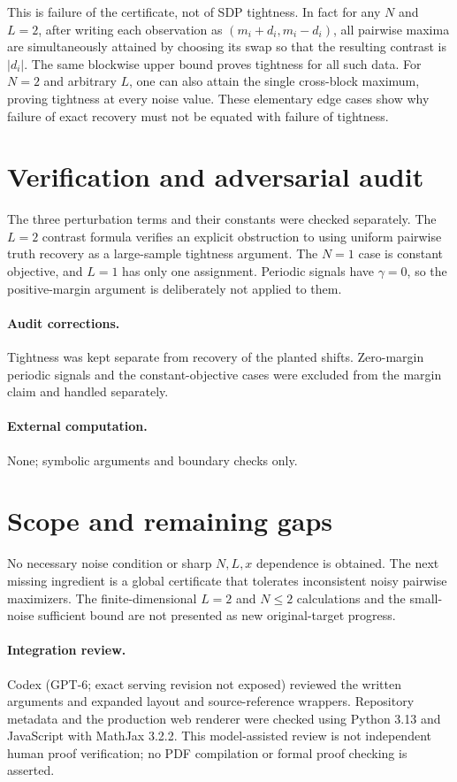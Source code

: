 \documentclass[11pt]{article}
\begin{document}
This is failure of the certificate, not of SDP tightness. In fact for any $N$
and $L=2$, after writing each observation as $(m_i+d_i,m_i-d_i)$, all pairwise
maxima are simultaneously attained by choosing its swap so that the resulting
contrast is $|d_i|$. The same blockwise upper bound proves tightness for all such
data. For $N=2$ and arbitrary $L$, one can also attain the single cross-block
maximum, proving tightness at every noise value. These elementary edge cases
show why failure of exact recovery must not be equated with failure of tightness.
\section{Verification and adversarial audit}
The three perturbation terms and their constants were checked separately.
The $L=2$ contrast formula verifies an explicit obstruction to using uniform
pairwise truth recovery as a large-sample tightness argument. The $N=1$ case is
constant objective, and $L=1$ has only one assignment. Periodic signals have
$\gamma=0$, so the positive-margin argument is deliberately not applied to them.
\paragraph{Audit corrections.} Tightness was kept separate from recovery of the planted shifts. Zero-margin periodic signals and the constant-objective cases were excluded from the margin claim and handled separately.
\paragraph{External computation.} None; symbolic arguments and boundary checks only.
\section{Scope and remaining gaps}
No necessary noise condition or sharp $N,L,x$ dependence is obtained. The
next missing ingredient is a global certificate that tolerates inconsistent noisy
pairwise maximizers. The finite-dimensional $L=2$ and $N\le2$ calculations and
the small-noise sufficient bound are not presented as new original-target progress.
\paragraph{Integration review.} Codex (GPT-6; exact serving revision not exposed) reviewed the written arguments and expanded layout and source-reference wrappers. Repository metadata and the production web renderer were checked using Python 3.13 and JavaScript with MathJax 3.2.2. This model-assisted review is not independent human proof verification; no PDF compilation or formal proof checking is asserted.
\end{document}
